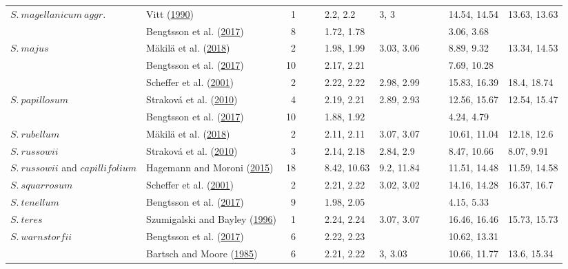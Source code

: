 \documentclass[
  12pt,
]{article}
\begin{document}
\begin{table}[H]
{\begin{tabular}[t]{llrllllllll}
\multirow[t]{-4}{*}{\raggedright\arraybackslash $S.~magellanicum~aggr.$} & Vitt (\protect\hyperlink{ref-Vitt.1990}{1990}) & 1 &  &  & 2.2, 2.2 & 3, 3 &  &  & 14.54, 14.54 & 13.63, 13.63\\
\cmidrule{1-11}
 & Bengtsson et al. (\protect\hyperlink{ref-Bengtsson.2017}{2017}) & 8 &  &  & 1.72, 1.78 &  &  &  & 3.06, 3.68 & \\

\multirow[t]{-2}{*}{\raggedright\arraybackslash $S.~majus$} & Mäkilä et al. (\protect\hyperlink{ref-Makila.2018}{2018}) & 2 &  &  & 1.98, 1.99 & 3.03, 3.06 &  &  & 8.89, 9.32 & 13.34, 14.53\\
\cmidrule{1-11}
 & Bengtsson et al. (\protect\hyperlink{ref-Bengtsson.2017}{2017}) & 10 &  &  & 2.17, 2.21 &  &  &  & 7.69, 10.28 & \\

 & Scheffer et al. (\protect\hyperlink{ref-Scheffer.2001}{2001}) & 2 &  &  & 2.22, 2.22 & 2.98, 2.99 &  &  & 15.83, 16.39 & 18.4, 18.74\\

\multirow[t]{-3}{*}{\raggedright\arraybackslash $S.~papillosum$} & Straková et al. (\protect\hyperlink{ref-Strakova.2010}{2010}) & 4 &  &  & 2.19, 2.21 & 2.89, 2.93 &  &  & 12.56, 15.67 & 12.54, 15.47\\
\cmidrule{1-11}
 & Bengtsson et al. (\protect\hyperlink{ref-Bengtsson.2017}{2017}) & 10 &  &  & 1.88, 1.92 &  &  &  & 4.24, 4.79 & \\

\multirow[t]{-2}{*}{\raggedright\arraybackslash $S.~rubellum$} & Mäkilä et al. (\protect\hyperlink{ref-Makila.2018}{2018}) & 2 &  &  & 2.11, 2.11 & 3.07, 3.07 &  &  & 10.61, 11.04 & 12.18, 12.6\\
\cmidrule{1-11}
$S.~russowii$ & Straková et al. (\protect\hyperlink{ref-Strakova.2010}{2010}) & 3 &  &  & 2.14, 2.18 & 2.84, 2.9 &  &  & 8.47, 10.66 & 8.07, 9.91\\
\cmidrule{1-11}
$S.~russowii$ and $capillifolium$ & Hagemann and Moroni (\protect\hyperlink{ref-Hagemann.2015}{2015}) & 18 &  &  & 8.42, 10.63 & 9.2, 11.84 &  &  & 11.51, 14.48 & 11.59, 14.58\\
\cmidrule{1-11}
$S.~squarrosum$ & Scheffer et al. (\protect\hyperlink{ref-Scheffer.2001}{2001}) & 2 &  &  & 2.21, 2.22 & 3.02, 3.02 &  &  & 14.16, 14.28 & 16.37, 16.7\\
\cmidrule{1-11}
$S.~tenellum$ & Bengtsson et al. (\protect\hyperlink{ref-Bengtsson.2017}{2017}) & 9 &  &  & 1.98, 2.05 &  &  &  & 4.15, 5.33 & \\
\cmidrule{1-11}
$S.~teres$ & Szumigalski and Bayley (\protect\hyperlink{ref-Szumigalski.1996}{1996}) & 1 &  &  & 2.24, 2.24 & 3.07, 3.07 &  &  & 16.46, 16.46 & 15.73, 15.73\\
\cmidrule{1-11}
$S.~warnstorfii$ & Bengtsson et al. (\protect\hyperlink{ref-Bengtsson.2017}{2017}) & 6 &  &  & 2.22, 2.23 &  &  &  & 10.62, 13.31 & \\
\cmidrule{1-11}
 & Bartsch and Moore (\protect\hyperlink{ref-Bartsch.1985}{1985}) & 6 &  &  & 2.21, 2.22 & 3, 3.03 &  &  & 10.66, 11.77 & 13.6, 15.34\\


\end{tabular}}
\end{table}
\end{document}
